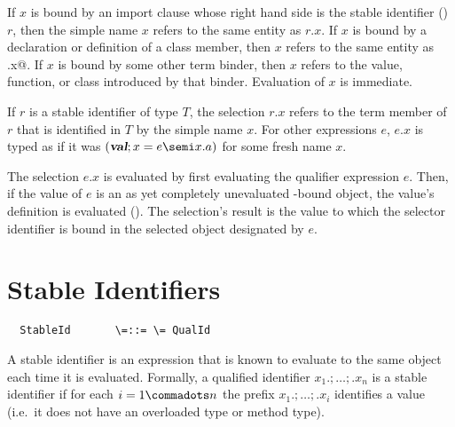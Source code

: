 \documentclass[11pt]{report}
\begin{document}
If $x$ is bound by an import clause whose right hand side is the
stable identifier () $r$, then the simple name $x$
refers to the same entity as $r.x$. If $x$ is bound by a declaration
or definition of a class member, then $x$ refers to the same entity as
\verb@this.x@. If $x$ is bound by some other term binder, then $x$
refers to the value, function, or class introduced by that binder.
Evaluation of $x$ is immediate.


If $r$ is a stable identifier of type $T$, the
selection $r.x$ refers to the term member of $r$ that is identified in
$T$ by the simple name $x$.  For other expressions $e$, $e.x$ is typed
as if it was $(\VAL;x=e\semi x.a)$ for some fresh name $x$.

The selection $e.x$ is evaluated by first evaluating the qualifier
expression $e$. Then, if the value of $e$ is an as yet completely
unevaluated \verb@let@-bound object, the value's definition is
evaluated (). The selection's result is the value to
which the selector identifier is bound in the selected object
designated by $e$.

\section{Stable Identifiers}
\label{sec:stableids}

\syntax\begin{verbatim}
  StableId       \=::= \= QualId
\end{verbatim}

A stable identifier is an expression that is known to evaluate to the
same object each time it is evaluated. Formally, a qualified
identifier $x_1.;\ldots;.x_n$ is a stable identifier if for each $i =
1 \commadots n$ the prefix $x_1.; \ldots ;.x_i$ identifies a value
(i.e.\ it does not have an overloaded type or method type).
\end{document}
